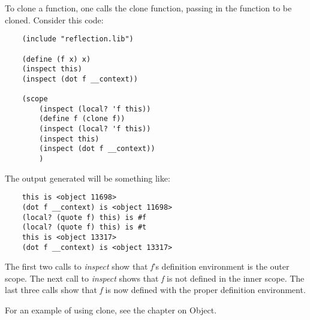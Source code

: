 To clone a function, one calls the clone function, passing
in the function to be cloned. Consider this code:

\begin{verbatim}
    (include "reflection.lib")

    (define (f x) x)
    (inspect this)
    (inspect (dot f __context))

    (scope
        (inspect (local? 'f this))
        (define f (clone f))
        (inspect (local? 'f this))
        (inspect this)
        (inspect (dot f __context))
        )
\end{verbatim}

The output generated will be something like:

\begin{verbatim}
    this is <object 11698>
    (dot f __context) is <object 11698>
    (local? (quote f) this) is #f
    (local? (quote f) this) is #t
    this is <object 13317>
    (dot f __context) is <object 13317>
\end{verbatim}

The first two calls to {\it inspect} show that {\it f}'s definition
environment is the outer scope. The next call to {\it inspect} shows that
{\it f} is not defined in the inner scope. The last three calls show that
{\it f} is now defined with the proper definition environment.

For an example of using clone, see the chapter on Object.
